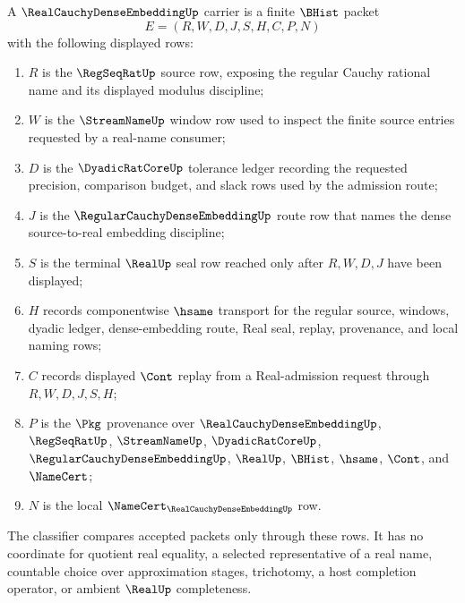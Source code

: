 \begin{definition}
\label{def:real-cauchy-dense-embedding-carrier}
A $\RealCauchyDenseEmbeddingUp$ carrier is a finite $\BHist$ packet
$$
E=(R,W,D,J,S,H,C,P,N)
$$
with the following displayed rows:
\begin{enumerate}
\item $R$ is the $\RegSeqRatUp$ source row, exposing the regular Cauchy rational name and its displayed modulus discipline;
\item $W$ is the $\StreamNameUp$ window row used to inspect the finite source entries requested by a real-name consumer;
\item $D$ is the $\DyadicRatCoreUp$ tolerance ledger recording the requested precision, comparison budget, and slack rows used by the admission route;
\item $J$ is the $\RegularCauchyDenseEmbeddingUp$ route row that names the dense source-to-real embedding discipline;
\item $S$ is the terminal $\RealUp$ seal row reached only after $R,W,D,J$ have been displayed;
\item $H$ records componentwise $\hsame$ transport for the regular source, windows, dyadic ledger, dense-embedding route, Real seal, replay, provenance, and local naming rows;
\item $C$ records displayed $\Cont$ replay from a Real-admission request through $R,W,D,J,S,H$;
\item $P$ is the $\Pkg$ provenance over $\RealCauchyDenseEmbeddingUp$, $\RegSeqRatUp$, $\StreamNameUp$, $\DyadicRatCoreUp$, $\RegularCauchyDenseEmbeddingUp$, $\RealUp$, $\BHist$, $\hsame$, $\Cont$, and $\NameCert$;
\item $N$ is the local $\NameCert_{\RealCauchyDenseEmbeddingUp}$ row.
\end{enumerate}
The classifier compares accepted packets only through these rows. It has no coordinate for quotient real equality, a selected representative of a real name, countable choice over approximation stages, trichotomy, a host completion operator, or ambient $\RealUp$ completeness.
\end{definition}

